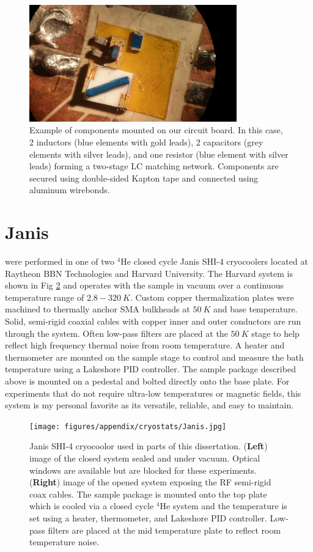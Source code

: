 \begin{figure}
\centering
\includegraphics[width = 0.8\textwidth]{figures/appendix/cryostats/sample_LC.jpg}
\caption{Example of components mounted on our circuit board. In this case, 2 inductors (blue elements with gold leads), 2 capacitors (grey elements with silver leads), and one resistor (blue element with silver leads) forming a two-stage LC matching network. Components are secured using double-sided Kapton tape and connected using aluminum wirebonds.}
\label{Fig:Appen:sample_LC}
\end{figure}


\section{Janis}

 were performed in one of two $^4$He closed cycle Janis SHI-4 cryocoolers located at Raytheon BBN Technologies and Harvard University. The Harvard system is shown in Fig \ref{Fig:Appen:Janis} and operates with the sample in vacuum over a continuous temperature range of $2.8-320~K$. Custom copper thermalization plates were machined to thermally anchor SMA bulkheads at $50~K$ and base temperature. Solid, semi-rigid coaxial cables with copper inner and outer conductors are run through the system. Often low-pass filters are placed at the $50~K$ stage to help reflect high frequency thermal noise from room temperature. A heater and thermometer are mounted on the sample stage to control and measure the bath temperature using a Lakeshore PID controller. The sample package described above is mounted on a pedestal and bolted directly onto the base plate. For experiments that do not require ultra-low temperatures or magnetic fields, this system is my personal favorite as its versatile, reliable, and easy to maintain.
\begin{figure}
\centering
\texttt{[image: figures/appendix/cryostats/Janis.jpg]}
\caption{Janis SHI-4 cryocoolor used in parts of this dissertation. (\textbf{Left}) image of the closed system sealed and under vacuum. Optical windows are available but are blocked for these experiments. (\textbf{Right}) image of the opened system exposing the RF semi-rigid coax cables. The sample package is mounted onto the top plate which is cooled via a closed cycle $^4$He system and the temperature is set using a heater, thermometer, and Lakeshore PID controller. Low-pass filters are placed at the mid temperature plate to reflect room temperature noise.}
\label{Fig:Appen:Janis}
\end{figure}

